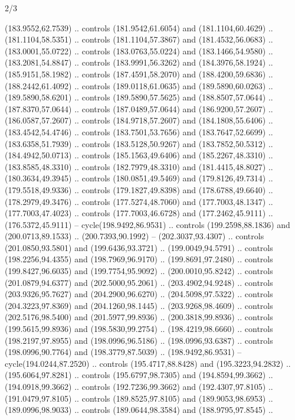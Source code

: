 \begin{flagdescription}{2/3}
\begin{scope}[xshift=0.5\flaglength,yshift=0.5\flagwidth,scale=\flagwidth/180]
\begin{scope}[y=0.8pt, x=0.8pt, yscale=-1,shift={(-168.75,-108.75)}]
  (183.9552,62.7539) .. controls (181.9542,61.6054) and (181.1104,60.4629) ..
  (181.1104,58.5351) .. controls (181.1104,57.3867) and (181.4532,56.0683) ..
  (183.0001,55.0722) .. controls (183.0763,55.0224) and (183.1466,54.9580) ..
  (183.2081,54.8847) .. controls (183.9991,56.3262) and (184.3976,58.1924) ..
  (185.9151,58.1982) .. controls (187.4591,58.2070) and (188.4200,59.6836) ..
  (188.2442,61.4092) .. controls (189.0118,61.0635) and (189.5890,60.0263) ..
  (189.5890,58.6201) .. controls (189.5890,57.5625) and (188.8507,57.0644) ..
  (187.8370,57.0644) .. controls (187.0489,57.0644) and (186.9200,57.2607) ..
  (186.0587,57.2607) .. controls (184.9718,57.2607) and (184.1808,55.6406) ..
  (183.4542,54.4746) .. controls (183.7501,53.7656) and (183.7647,52.6699) ..
  (183.6358,51.7939) .. controls (183.5128,50.9267) and (183.7852,50.5312) ..
  (184.4942,50.0713) .. controls (185.1563,49.6406) and (185.2267,48.3310) ..
  (183.8585,48.3310) .. controls (182.7979,48.3310) and (181.4415,48.8027) ..
  (180.3634,49.3945) .. controls (180.0851,49.5469) and (179.8126,49.7314) ..
  (179.5518,49.9336) .. controls (179.1827,49.8398) and (178.6788,49.6640) ..
  (178.2979,49.3476) .. controls (177.5274,48.7060) and (177.7003,48.1347) ..
  (177.7003,47.4023) .. controls (177.7003,46.6728) and (177.2462,45.9111) ..
  (176.5372,45.9111) -- cycle(198.9492,86.9531) .. controls (199.2598,88.1836)
  and (200.0713,89.1533) .. (200.7393,90.1992) -- (202.3037,93.4307) .. controls
  (201.0850,93.5801) and (199.6436,93.3721) .. (199.0049,94.5791) .. controls
  (198.2256,94.4355) and (198.7969,96.9170) .. (199.8691,97.2480) .. controls
  (199.8427,96.6035) and (199.7754,95.9092) .. (200.0010,95.8242) .. controls
  (201.0879,94.6377) and (202.5000,95.2061) .. (203.4902,94.9248) .. controls
  (203.9326,95.7627) and (204.2900,96.6270) .. (204.5098,97.5322) .. controls
  (204.3223,97.8369) and (204.1260,98.1445) .. (203.9268,98.4609) .. controls
  (202.5176,98.5400) and (201.5977,99.8936) .. (200.3818,99.8936) .. controls
  (199.5615,99.8936) and (198.5830,99.2754) .. (198.4219,98.6660) .. controls
  (198.2197,97.8955) and (198.0996,96.5186) .. (198.0996,93.6387) .. controls
  (198.0996,90.7764) and (198.3779,87.5039) .. (198.9492,86.9531) --
  cycle(194.0244,87.2520) .. controls (195.4717,88.8428) and (195.3223,94.2832)
  .. (195.6064,97.8281) .. controls (195.6797,98.7305) and (194.8594,99.3662) ..
  (194.0918,99.3662) .. controls (192.7236,99.3662) and (192.4307,97.8105) ..
  (191.0479,97.8105) .. controls (189.8525,97.8105) and (189.9053,98.6953) ..
  (189.0996,98.9033) .. controls (189.0644,98.3584) and (188.9795,97.8545) ..

\end{scope}
\end{scope}
\end{flagdescription}
